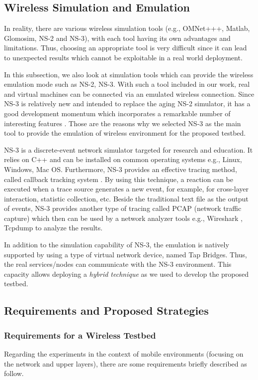\subsection{Wireless Simulation and Emulation}
In reality, there are various wireless simulation tools (e.g., OMNet+++, Matlab, Glomosim, NS-2 and NS-3), with each tool having its own advantages and limitations. Thus, choosing an appropriate tool is very difficult since it can lead to unexpected results which cannot be exploitable in a real world deployment. 

In this subsection, we also look at simulation tools which can provide the wireless emulation mode such as NS-2, NS-3. With such a tool included in our work, real and virtual machines can be connected via an emulated wireless connection. Since NS-3 is relatively new and intended to replace the aging NS-2 simulator, it has a good development momentum which incorporates a remarkable number of interesting features \cite{NS-3-goal}. Those are the reasons why we selected NS-3 as the main tool to provide the emulation of wireless environment for the proposed testbed.

NS-3 is a discrete-event network simulator targeted for research and education. It relies on C++ and can be installed on common operating systems e.g., Linux, Windows, Mac OS. Furthermore, NS-3 provides an effective tracing method, called callback tracking system \cite{NS-3-goal}. By using this technique, a reaction can be executed when a trace source generates a new event, for example, for cross-layer interaction, statistic collection, etc. Beside the traditional text file as the output of events, NS-3 provides another type of tracing called PCAP (network traffic capture) which then can be used by a network analyzer tools e.g., Wireshark \cite{Wireshark}, Tcpdump \cite{Tcpdump} to analyze the results.

In addition to the simulation capability of NS-3, the emulation is natively supported by using a type of virtual network device, named Tap Bridges. Thus, the real services/nodes can communicate with the NS-3 environment. This capacity allows deploying a \textit{hybrid technique} as we used to develop the proposed testbed. 

\subsection{Requirements and Proposed Strategies}
\subsubsection{Requirements for a Wireless Testbed}
Regarding the experiments in the context of mobile environments (focusing on the network and upper layers), there are some requirements briefly described as follow. 

